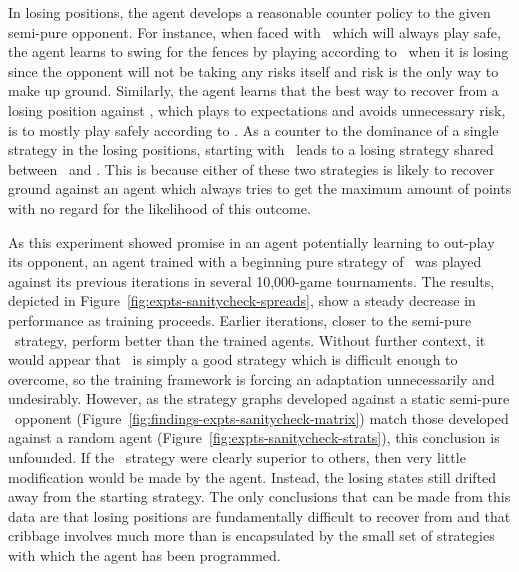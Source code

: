 In losing positions,
the agent develops a reasonable counter policy
to the given semi-pure opponent.
%
For instance,
when faced with \handmaxmin\ which will always play safe,
the agent learns to swing for the fences by playing according to \handmaxposs\ 
when it is losing
since the opponent will not be taking any risks itself
and risk is the only way to make up ground.
%
Similarly,
the agent learns that the best way to recover from a losing position
against \handmaxavg,
which plays to expectations and avoids unnecessary risk,
is to mostly play safely according to \handmaxmin.
%
As a counter to the dominance of a single strategy in the losing positions,
starting with \handmaxposs\ leads to a losing strategy
shared between \handmaxavg\ and \handmaxmed.
%
This is because either of these two strategies is likely to recover ground
against an agent which always tries to get the maximum amount of points
with no regard for the likelihood of this outcome.



As this experiment showed promise in an agent potentially learning
to out-play its opponent,
an agent trained with a beginning pure strategy of \handmaxavg\ was played
against its previous iterations in several 10,000-game tournaments.
%
The results,
depicted in Figure~\ref{fig:expts-sanitycheck-spreads},
show a steady decrease in performance as training proceeds.
%
Earlier iterations,
closer to the semi-pure \handmaxavg\ strategy,
perform better than the trained agents.
%
Without further context,
it would appear that \handmaxavg\ is simply a good strategy which is difficult
enough to overcome,
so the training framework is forcing an adaptation
unnecessarily and undesirably.
%
However,
as the strategy graphs developed against a static semi-pure \handmaxavg\ 
opponent
(Figure~\ref{fig:findings-expts-sanitycheck-matrix})
match those developed against a random agent
(Figure~\ref{fig:expts-sanitycheck-strats}),
this conclusion is unfounded.
%
If the \handmaxavg\ strategy were clearly superior to others,
then very little modification would be made by the agent.
%
Instead,
the losing states still drifted away from the starting strategy.
%
The only conclusions that can be made from this data are that
losing positions are fundamentally difficult to recover from
and that
cribbage involves much more than is encapsulated by the small set of
strategies with which the agent has been programmed.

